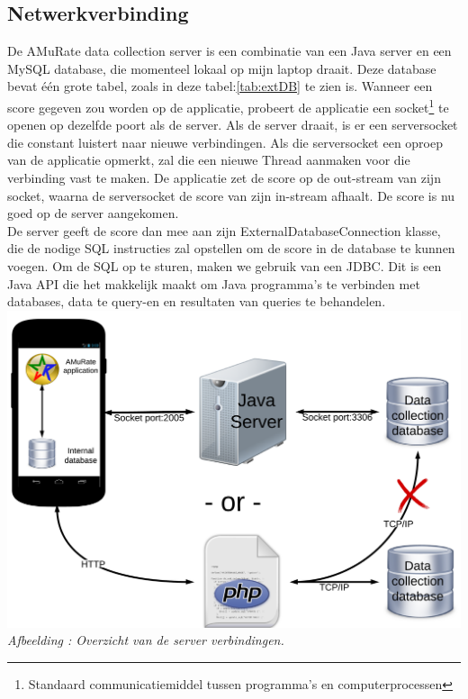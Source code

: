 \documentclass[11pt,a4paper]{article}
\newcounter{figc}
\newcommand{\increaseFigID} {%
   \stepcounter{figc}%
   \thefigc}
\newcommand{\figID}[1]{\small \textit{Afbeelding \increaseFigID : #1} \\ \normalsize}
\begin{document}
	\subsection{Netwerkverbinding}
	\label{sec:Netwerkverbinding}
	De AMuRate data collection server is een combinatie van een Java server en een MySQL database, die momenteel lokaal op mijn laptop draait. Deze database bevat één grote tabel, zoals in deze tabel:\ref{tab:extDB} te zien is. Wanneer een score gegeven zou worden op de applicatie, probeert de applicatie een socket\footnote{Standaard communicatiemiddel tussen programma's en computerprocessen} te openen op dezelfde poort als de server. Als de server draait, is er een serversocket die constant luistert naar nieuwe verbindingen. Als die serversocket een oproep van de applicatie opmerkt, zal die een nieuwe Thread aanmaken voor die verbinding vast te maken. De applicatie zet de score op de out-stream van zijn socket, waarna de serversocket de score van zijn in-stream afhaalt. De score is nu goed op de server aangekomen. \\
De server geeft de score dan mee aan zijn ExternalDatabaseConnection klasse, die de nodige SQL instructies zal opstellen om de score in de database te kunnen voegen. Om de SQL op te sturen, maken we gebruik van een JDBC. Dit is een Java API die het makkelijk maakt om Java programma's te verbinden met databases, data te query-en en resultaten van queries te behandelen. \\

	\includegraphics[scale=0.12]{Pictures/Sockets3.png} \newline
	\figID{Overzicht van de server verbindingen.}
\end{document}
